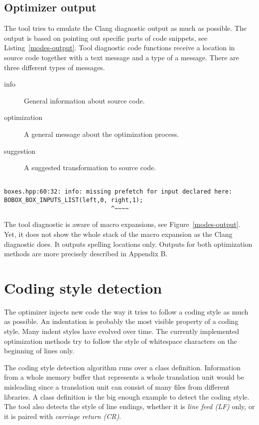 \subsection{Optimizer output}
The tool tries to emulate the Clang diagnostic output as much as possible. The output is based on pointing out specific parts of code snippets, see Listing~\ref{modes-output}. Tool diagnostic code functions receive a location in source code together with a text message and a type of a message. There are three different types of messages.

\begin{description}
\item[info]{General information about source code.}
\item[optimization]{A general message about the optimization process.}
\item[suggestion]{A suggested transformation to source code.}
\end{description}

\begin{lstlisting}[caption={An example of the tool diagnostic output.},label={modes-output}]

boxes.hpp:60:32: info: missing prefetch for input declared here:
BOBOX_BOX_INPUTS_LIST(left,0, right,1);
                              ^~~~~
\end{lstlisting}

The tool diagnostic is aware of macro expansions, see Figure~\ref{modes-output}. Yet, it does not show the whole stack of the macro expansion as the Clang diagnostic does. It outputs spelling locations only. Outputs for both optimization methods are more precisely described in Appendix B.

\section{Coding style detection}
The optimizer injects new code the way it tries to follow a coding style as much as possible. An indentation is probably the most visible property of a coding style. Many indent styles have evolved over time. The currently implemented optimization methods try to follow the style of whitespace characters on the beginning of lines only.

The coding style detection algorithm runs over a class definition. Information from a whole memory buffer that represents a whole translation unit would be misleading since a translation unit can consist of many files from different libraries. A class definition is the big enough example to detect the coding style. The tool also detects the style of line endings, whether it is \emph{line feed (LF)} only, or it is paired with \emph{carriage return (CR)}.

